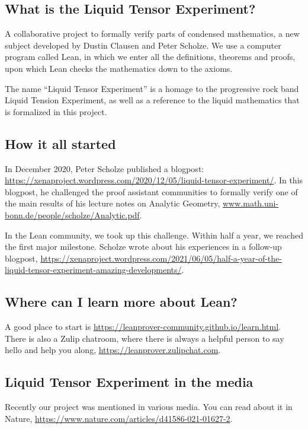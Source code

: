 \maketitle

\subsection{What is the Liquid Tensor Experiment?}

A collaborative project to formally verify parts of condensed mathematics,
a new subject developed by Dustin Clausen and Peter Scholze.
We use a computer program called Lean,
in which we enter all the definitions, theorems and proofs,
upon which Lean checks the mathematics down to the axioms.

The name ``Liquid Tensor Experiment'' is a homage
to the progressive rock band Liquid Tension Experiment,
as well as a reference to the liquid mathematics that is formalized in this project.

\subsection{How it all started}

In December 2020, Peter Scholze published a blogpost:
\url{https://xenaproject.wordpress.com/2020/12/05/liquid-tensor-experiment/}.
In this blogpost, he challenged the proof assistant communities
to formally verify one of the main results of his lecture notes on
Analytic Geometry, \url{www.math.uni-bonn.de/people/scholze/Analytic.pdf}.

In the Lean community, we took up this challenge.
Within half a year, we reached the first major milestone.
Scholze wrote about his experiences in a follow-up blogpost,
\url{https://xenaproject.wordpress.com/2021/06/05/half-a-year-of-the-liquid-tensor-experiment-amazing-developments/}.

\subsection{Where can I learn more about Lean?}

A good place to start is \url{https://leanprover-community.github.io/learn.html}.
There is also a Zulip chatroom, where there is always a helpful person to say hello and help you along,
\url{https://leanprover.zulipchat.com}.

\subsection{Liquid Tensor Experiment in the media}

Recently our project was mentioned in various media.
You can read about it in Nature,
\url{https://www.nature.com/articles/d41586-021-01627-2}.










